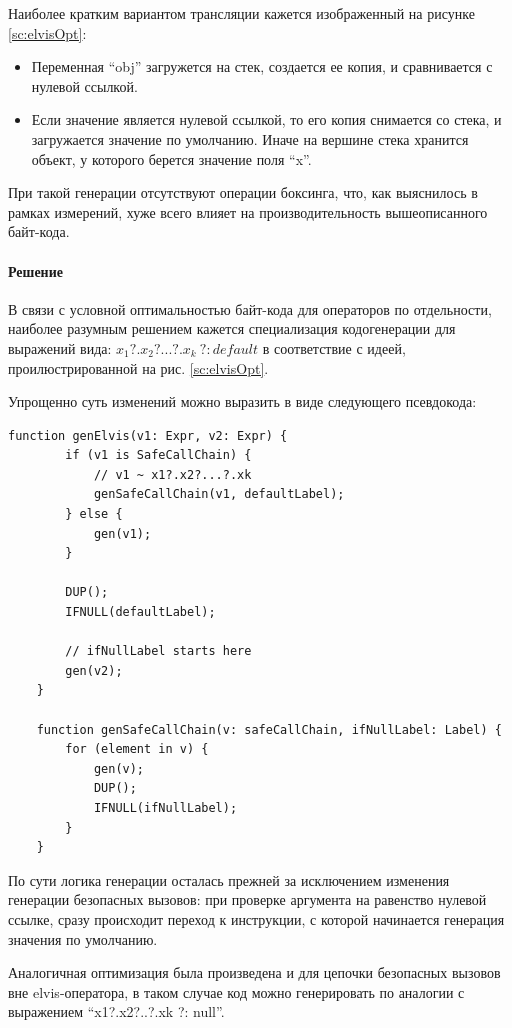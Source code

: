 Наиболее кратким вариантом трансляции кажется изображенный на рисунке \ref{sc:elvisOpt}:
\begin{itemize}
    \item Переменная ``obj'' загружется на стек, создается ее копия, и сравнивается с нулевой
    ссылкой.
    \item Если значение является нулевой ссылкой, то его копия снимается со стека, и загружается
    значение по умолчанию.
    Иначе на вершине стека хранится объект, у которого берется значение поля ``x''.
\end{itemize}

При такой генерации отсутствуют операции боксинга, что, как выяснилось в рамках измерений,
хуже всего влияет на производительность вышеописанного байт-кода.

\paragraph{Решение}
В связи с условной оптимальностью байт-кода для операторов по отдельности, наиболее разумным
решением кажется специализация кодогенерации для выражений вида: $x_1?.x_2?...?.x_k\ ?: default$
в соответствие с идеей, проилюстрированной на рис. \ref{sc:elvisOpt}.

Упрощенно суть изменений можно выразить в виде следующего псевдокода:
\begin{lstlisting}[frame=single]
    function genElvis(v1: Expr, v2: Expr) {
        if (v1 is SafeCallChain) {
            // v1 ~ x1?.x2?...?.xk
            genSafeCallChain(v1, defaultLabel);
        } else {
            gen(v1);
        }

        DUP();
        IFNULL(defaultLabel);

        // ifNullLabel starts here
        gen(v2);
    }

    function genSafeCallChain(v: safeCallChain, ifNullLabel: Label) {
        for (element in v) {
            gen(v);
            DUP();
            IFNULL(ifNullLabel);
        }
    }
\end{lstlisting}

По сути логика генерации осталась прежней за исключением изменения генерации безопасных вызовов:
при проверке аргумента на равенство нулевой ссылке, сразу происходит переход к инструкции,
с которой начинается генерация значения по умолчанию.

Аналогичная оптимизация была произведена и для цепочки безопасных вызовов вне elvis-оператора,
в таком случае код можно генерировать по аналогии с выражением ``x1?.x2?..?.xk ?: null''.

